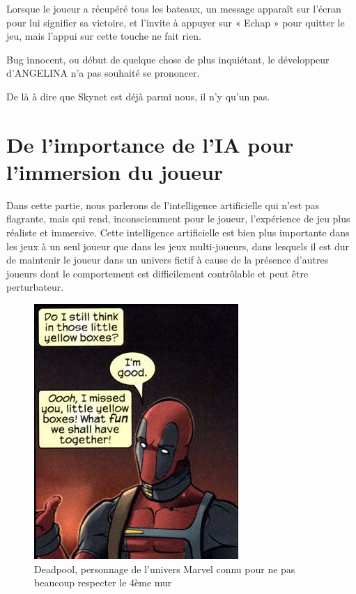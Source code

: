 \documentclass[a4paper, 12pt]{article} %
\begin{document}
Lorsque le joueur a récupéré tous les bateaux, un message apparaît sur l'écran pour lui signifier sa victoire, et l'invite à appuyer sur « Echap » pour quitter le jeu, mais l'appui sur cette touche ne fait rien. 

Bug innocent, ou début de quelque chose de plus inquiétant, le développeur d'ANGELINA n'a pas souhaité se prononcer.

De là à dire que Skynet est déjà parmi nous, il n'y qu'un pas. 


\newpage
\section{De l’importance de l’IA pour l’immersion du joueur}

Dans cette partie, nous parlerons de l’intelligence artificielle qui n’est pas flagrante, mais qui rend, inconsciemment pour le joueur, l'expérience de jeu plus réaliste et immersive. Cette intelligence artificielle est bien plus importante dans les jeux à un seul joueur que dans les jeux multi-joueurs, dans lesquels il est dur de maintenir le joueur dans un univers fictif à cause de la présence d’autres joueurs dont le comportement est difficilement contrôlable et peut être perturbateur.

\begin{figure}[!h]%
	\begin{center} 
		\includegraphics[width=0.60\columnwidth]{images/deadpool.png}%
		\caption{Deadpool, personnage de l’univers Marvel connu pour ne pas beaucoup respecter le 4ème mur}%
	\end{center}
\end{figure}
\end{document}
